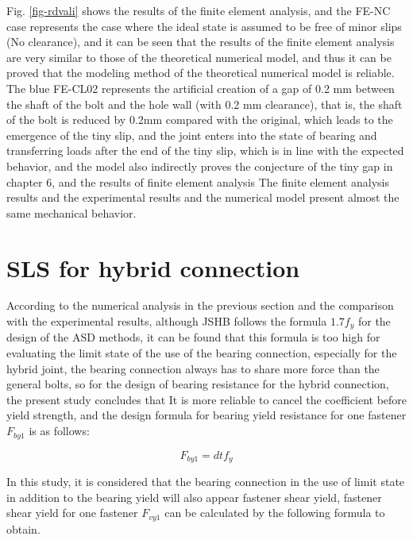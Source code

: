 Fig. \ref{fig-rdvali} shows the results of the finite element analysis, and the FE-NC case represents the case where the ideal state is assumed to be free of minor slips (No clearance), and it can be seen that the results of the finite element analysis are very similar to those of the theoretical numerical model, and thus it can be proved that the modeling method of the theoretical numerical model is reliable. The blue FE-CL02 represents the artificial creation of a gap of 0.2 mm between the shaft of the bolt and the hole wall (with 0.2 mm clearance), that is, the shaft of the bolt is reduced by 0.2mm compared with the original, which leads to the emergence of the tiny slip, and the joint enters into the state of bearing and transferring loads after the end of the tiny slip, which is in line with the expected behavior, and the model also indirectly proves the conjecture of the tiny gap in chapter 6, and the results of finite element analysis The finite element analysis results and the experimental results and the numerical model present almost the same mechanical behavior.




\section{SLS for hybrid connection}

According to the numerical analysis in the previous section and the comparison with the experimental results, although JSHB follows the formula $1.7f_y$ for the design of the \ac{ASD} methods, it can be found that this formula is too high for evaluating the limit state of the use of the bearing connection, especially for the hybrid joint, the bearing connection always has to share more force than the general bolts, so for the design of bearing resistance for the hybrid connection, the present study concludes that It is more reliable to cancel the coefficient before yield strength, and the design formula for bearing yield resistance for one fastener $F_{by1}$ is as follows:

\begin{equation}
    F_{by1} = dtf_y
\end{equation}

In this study, it is considered that the bearing connection in the use of limit state in addition to the bearing yield will also appear fastener shear yield, fastener shear yield for one fastener $F_{vy1}$ can be calculated by the following formula to obtain.

